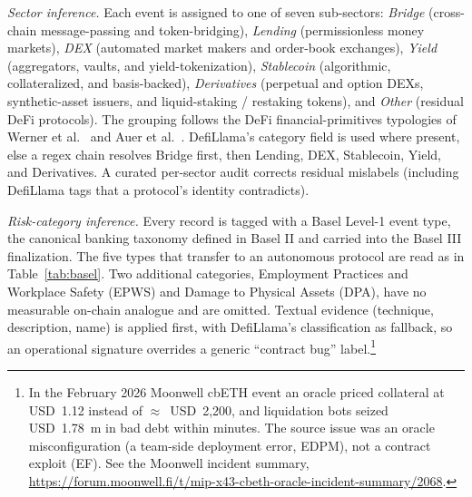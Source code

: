 \documentclass[runningheads]{llncs}
\begin{document}
\emph{Sector inference.} Each event is assigned to one of seven
sub-sectors: \emph{Bridge} (cross-chain message-passing and
token-bridging), \emph{Lending} (permissionless money markets),
\emph{DEX} (automated market makers and order-book exchanges),
\emph{Yield} (aggregators, vaults, and yield-tokenization),
\emph{Stablecoin} (algorithmic, collateralized, and basis-backed), 
\emph{Derivatives} (perpetual and option DEXs,
synthetic-asset issuers, and liquid-staking / restaking tokens), and \emph{Other} (residual DeFi protocols). The grouping follows the DeFi
financial-primitives typologies of Werner et al.~\cite{Werner2022}
and Auer et al.~\cite{Auer2024}. DefiLlama's category field
is used where present, else a regex chain resolves Bridge first, then
Lending, DEX, Stablecoin, Yield, and Derivatives. A curated per-sector
audit corrects residual mislabels (including DefiLlama tags that a
protocol's identity contradicts).

\emph{Risk-category inference.} Every record is tagged with a Basel
Level-1 event type, the canonical banking taxonomy defined in Basel II \citep{BCBS2006} 
and carried into the Basel III finalization. The five types that transfer to an
autonomous protocol are read as in Table~\ref{tab:basel}. Two additional 
categories, Employment Practices and Workplace Safety (EPWS) and Damage to Physical Assets (DPA), have no measurable on-chain analogue and are omitted. 
Textual evidence (technique, description, name) is applied first, with
DefiLlama's classification as fallback, so an operational signature
overrides a generic ``contract bug'' label.\footnote{In the February
2026 Moonwell cbETH event an oracle priced collateral at
USD~1.12 instead of $\approx$~USD~2{,}200, and liquidation bots
seized USD~1.78~m in bad debt within minutes. The source issue was an oracle 
misconfiguration (a team-side deployment error, EDPM), 
not a contract exploit (EF). See the Moonwell incident summary, 
\url{https://forum.moonwell.fi/t/mip-x43-cbeth-oracle-incident-summary/2068}.}
\end{document}

